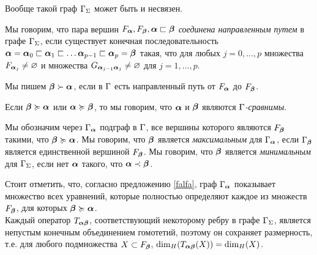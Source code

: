 Вообще такой граф $\Gamma_\Sigma$ может быть и несвязен.

\begin{definition}
Мы говорим, что пара вершин $F_{\bm{\alpha}}, F_{\bm{\beta}}, {\bm{\alpha}}\sqsubset{\bm{\beta}}$ {\em соединена направленным путем} в графе $\Gamma_\Sigma$, если существует конечная последовательность  ${\bm{\alpha}}={\bm{\alpha}}_0\sqsubset{\bm{\alpha}}_1\sqsubset\ldots {\bm{\alpha}}_{p-1}\sqsubset{\bm{\alpha}}_p={\bm{\beta}}$ такая, что для любых  $j=0,\ldots  ,p$ множества $F_{{\bm{\alpha}}_j}\neq\varnothing$  и множества $G_{{\bm{\alpha}}_{j-1}{\bm{\alpha}}_j}\neq\varnothing$ для $j=1,\ldots  ,p$.   
\end{definition}

Мы пишем ${\bm{\beta}}\succ{\bm{\alpha}}$, если в $\Gamma$ есть направленный путь от $F_{\bm{\alpha}}$ до $F_{\bm{\beta}}$.

Если ${\bm{\beta}}\succcurlyeq{\bm{\alpha}}$ или ${\bm{\alpha}}\succcurlyeq{\bm{\beta}}$, то мы говорим, что ${\bm{\alpha}}$ и ${\bm{\beta}}$ являются $\Gamma${\em-сравнимы}.

Мы обозначим через $\Gamma_{\bm{\alpha}}$ подграф в $\Gamma$, все вершины которого являются $F_{\bm{\beta}}$ такими, что ${\bm{\beta}}\succcurlyeq{\bm{\alpha}}$. 
Мы говорим, что ${\bm{\beta}}$ является {\em максимальным} для $\Gamma_{\bm{\alpha}}$, если $\Gamma_{\bm{\beta}}$ является единственной вершиной $F_{\bm{\beta}}$.
Мы говорим, что ${\bm{\beta}}$ является {\em минимальным} для $\Gamma_\Sigma$, если нет ${\bm{\alpha}}$ такого, что ${\bm{\alpha}}\prec{\bm{\beta}}$.

Стоит отметить, что, согласно предложению \ref{falfa}, граф $\Gamma_{\bm{\alpha}}$ показывает множество всех уравнений, которые полностью определяют каждое из множеств $F_{\bm{\beta}}$, для которых ${\bm{\beta}}\succcurlyeq{\bm{\alpha}}$.\\

Каждый оператор $T_{{\bm{\alpha}}{\bm{\beta}}}$, соответствующий некоторому ребру в графе $\Gamma_\Sigma$, является непустым конечным объединением гомотетий, поэтому он сохраняет размерность, т.е. для любого подмножества $X\subset F_{\bm{\beta}}$, $\dim_H(T_{{\bm{\alpha}}{\bm{\beta}}}(X))=\dim_H(X)$.\\


